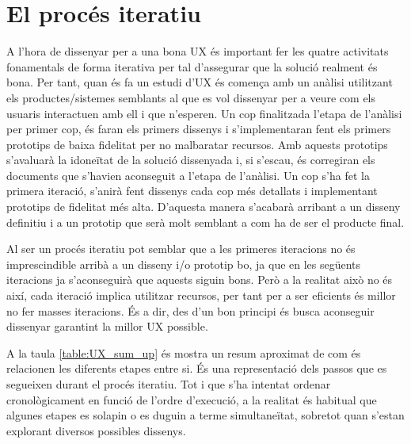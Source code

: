 \section{El procés iteratiu}
A l'hora de dissenyar per a una bona \ac{UX} és important fer les quatre activitats fonamentals de forma iterativa per tal d'assegurar que la solució realment és bona. Per tant, quan és fa un estudi d'\ac{UX} és comença amb un anàlisi utilitzant els productes/sistemes semblants al que es vol dissenyar per a veure com els usuaris interactuen amb ell i que n'esperen. Un cop finalitzada l'etapa de l'anàlisi per primer cop, és faran els primers dissenys i s'implementaran fent els primers prototips de baixa fidelitat per no malbaratar recursos. Amb aquests prototips s'avaluarà la idoneïtat de la solució dissenyada i, si s'escau, és corregiran els documents que s'havien aconseguit a l'etapa de l'anàlisi. Un cop s'ha fet la primera iteració, s'anirà fent dissenys cada cop més detallats i implementant prototips de fidelitat més alta. D'aquesta manera s'acabarà arribant a un disseny definitiu i a un prototip que serà molt semblant a com ha de ser el producte final.

Al ser un procés iteratiu pot semblar que a les primeres iteracions no és imprescindible arribà a un disseny i/o prototip bo, ja que en les següents iteracions ja s'aconseguirà que aquests siguin bons. Però a la realitat això no és així, cada iteració implica utilitzar recursos, per tant per a ser eficients és millor no fer masses iteracions. És a dir, des d'un bon principi és busca aconseguir dissenyar garantint la millor \ac{UX} possible.

A la taula \ref{table:UX_sum_up} és mostra un resum aproximat de com és relacionen les diferents etapes entre si. És una representació dels passos que es segueixen durant el procés iteratiu. Tot i que s'ha intentat ordenar cronològicament en funció de l'ordre d'execució, a la realitat és habitual que algunes etapes es solapin o es duguin a terme simultaneïtat, sobretot quan s'estan explorant diversos possibles dissenys.

